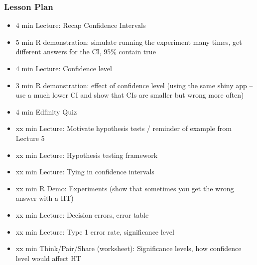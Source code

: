 \begin{frame}
    \frametitle{Lesson Plan}
    \begin{itemize}
        \item 4 min Lecture: Recap Confidence Intervals
        \item 5 min R demonstration: simulate running the experiment many times, get different answers for the CI, 95\% contain true
        \item 4 min Lecture: Confidence level
        \item 3 min R demonstration: effect of confidence level (using the same shiny app -- use a much lower CI and show that CIs are smaller but wrong more often)
        \item 4 min Edfinity Quiz
    
        \item xx min Lecture: Motivate hypothesis tests / reminder of example from Lecture 5
        \item xx min Lecture: Hypothesis testing framework
        \item xx min Lecture: Tying in confidence intervals
        \item xx min R Demo: Experiments (show that sometimes you get the wrong answer with a HT)
        \item xx min Lecture: Decision errors, error table
        
        \item xx min Lecture: Type 1 error rate, significance level
        \item xx min Think/Pair/Share (worksheet): Significance levels, how confidence level would affect HT

    \end{itemize}
\end{frame}




    